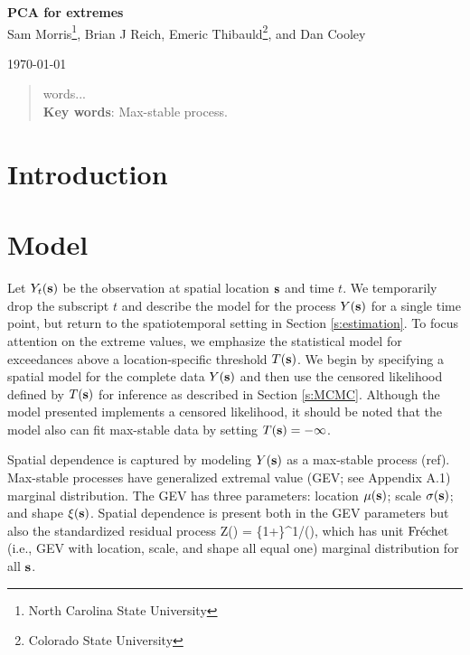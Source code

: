 \documentclass[11pt]{article}
\begin{document}
\linenumbers
\pagestyle{empty}
\begin{center}
{\Large {\bf PCA for extremes}}\\

{\large Sam Morris\footnote[1]{North Carolina State University}, Brian J Reich\footnotemark[1]{}, Emeric Thibauld\footnote[2]{Colorado State University}, and Dan Cooley\footnotemark[2]{}}

\today
\end{center}


\begin{abstract}
	words...\\
	{\bf Key words}: Max-stable process.

\end{abstract}
\newpage
\pagestyle{plain}
\setcounter{page}{1}

\section{Introduction}\label{s:intro}

\section{Model}\label{s:model}

Let $Y_{t}(\mbox{\bf s})$ be the observation at spatial location $\mbox{\bf s}$ and time $t$.  We temporarily drop the subscript $t$ and describe the model for the process $Y(\mbox{\bf s})$ for a single time point, but return to the spatiotemporal setting in Section \ref{s:estimation}.
To focus attention on the extreme values, we emphasize the statistical model for exceedances above a location-specific threshold $T(\mbox{\bf s})$.
We begin by specifying a spatial model for the complete data $Y(\mbox{\bf s})$ and then use the censored likelihood defined by $T(\mbox{\bf s})$ for inference as described in Section \ref{s:MCMC}.
Although the model presented implements a censored likelihood, it should be noted that the model also can fit max-stable data by setting $T(\mbox{\bf s}) = -\infty$.

Spatial dependence is captured by modeling $Y(\mbox{\bf s})$ as a max-stable process (ref).
Max-stable processes have generalized extremal value (GEV; see Appendix A.1) marginal distribution.
The GEV has three parameters: location $\mu(\mbox{\bf s})$; scale $\sigma(\mbox{\bf s})$; and shape $\xi(\mbox{\bf s})$.
Spatial dependence is present both in the GEV parameters but also the standardized residual process
\beq\label{Y2Z}
 Z(\bs) = \left\{1+\frac{\xi(\bs)}{\sigma(\bs)}\left[Y(\bs) - \mu(\bs)\right]\right\}^{1/\xi(\bs)},
\eeq which has unit $\mbox{Fr$\acute{\mbox{e}}$chet }$ (i.e., GEV with location, scale, and shape all equal one) marginal distribution for all $\mbox{\bf s}$.
\end{document}
